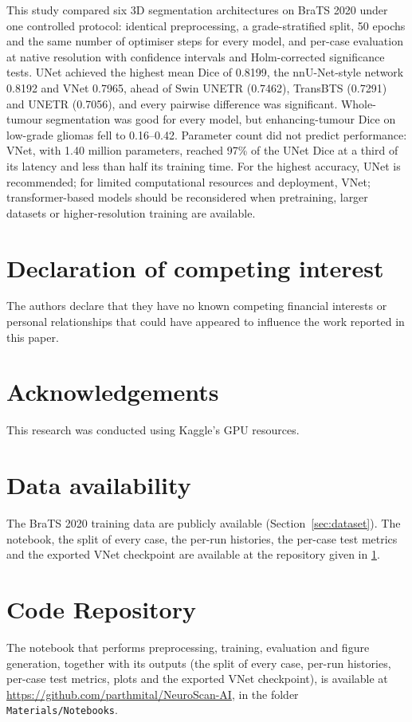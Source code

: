 \documentclass[a4paper,fleqn]{cas-sc}
\begin{document}
This study compared six 3D segmentation architectures on BraTS 2020 under one controlled protocol: identical preprocessing, a grade-stratified split, 50 epochs and the same number of optimiser steps for every model, and per-case evaluation at native resolution with confidence intervals and Holm-corrected significance tests. UNet achieved the highest mean Dice of 0.8199, the nnU-Net-style network 0.8192 and VNet 0.7965, ahead of Swin UNETR (0.7462), TransBTS (0.7291) and UNETR (0.7056), and every pairwise difference was significant. Whole-tumour segmentation was good for every model, but enhancing-tumour Dice on low-grade gliomas fell to 0.16--0.42. Parameter count did not predict performance: VNet, with 1.40 million parameters, reached 97\% of the UNet Dice at a third of its latency and less than half its training time. For the highest accuracy, UNet is recommended; for limited computational resources and deployment, VNet; transformer-based models should be reconsidered when pretraining, larger datasets or higher-resolution training are available.

\section*{Declaration of competing interest}

The authors declare that they have no known competing financial interests or personal relationships that could have appeared to influence the work reported in this paper.

\section*{Acknowledgements}

This research was conducted using Kaggle's GPU resources.

\section*{Data availability}

The BraTS 2020 training data are publicly available (Section~\ref{sec:dataset}). The notebook, the split of every case, the per-run histories, the per-case test metrics and the exported VNet checkpoint are available at the repository given in \ref{app:code}.

\appendix

\section{Code Repository}
\label{app:code}

The notebook that performs preprocessing, training, evaluation and figure generation, together with its outputs (the split of every case, per-run histories, per-case test metrics, plots and the exported VNet checkpoint), is available at \url{https://github.com/parthmital/NeuroScan-AI}, in the folder \texttt{Materials/Notebooks}.



\end{document}
